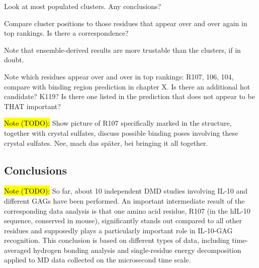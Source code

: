 Look at most populated clusters. Any conclusions?

Compare cluster positions to those residues that appear over and over again in
top rankings. Is there a correspondence?

Note that ensemble-derived results are more trustable than the clusters, if in
doubt.


Note which residues appear over and over in top rankings: R107, 106, 104,
compare with binding region prediction in chapter X. Is there an additional hot
candidate? K119? Is there one listed in the prediction that does not appear
to be THAT important?




\hl{Note (TODO):}
Show picture of R107 specifically marked in the structure, together with
crystal sulfates, discuss possible binding poses involving these crystal
sulfates. Nee, mach das später, bei bringing it all together.





\subsection{Conclusions}

\hl{Note (TODO):}
So far, about 10 independent DMD studies involving IL-10 and different GAGs
have been performed. An important intermediate result of the corresponding data
analysis is that one amino acid residue, R107 (in the hIL-10 sequence, conserved
in mouse), significantly stands out compared to all other residues and
supposedly plays a particularly important role in IL-10-GAG recognition. This
conclusion is based on different types of data, including time-averaged hydrogen
bonding analysis and single-residue energy decomposition applied to MD data
collected on the microsecond time scale.

